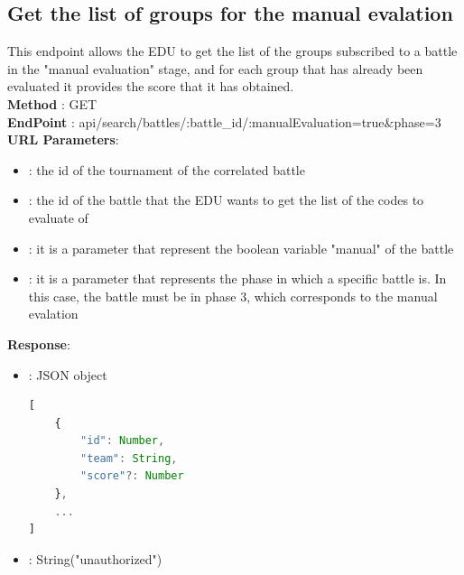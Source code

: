 \subsection*{Get the list of groups for the manual evalation}
This endpoint allows the EDU to get the list of the groups subscribed to a battle in the "manual evaluation" stage, and for each group that has already been evaluated it provides the score that it has obtained.\\
\textbf{Method} : GET \\
\textbf{EndPoint} : api/search/battles/:battle\_id/:manualEvaluation=true\&phase=3 \\
\textbf{URL Parameters}:
\begin{itemize}
    \item {} : the id of the tournament of the correlated battle
    \item {} : the id of the battle that the EDU wants to get the list of the codes to evaluate of
    \item {} : it is a parameter that represent the boolean variable "manual" of the battle
    \item {} : it is a parameter that represents the phase in which a specific battle is. In this case, the battle must be in phase 3, which corresponds to the manual evalation
\end{itemize}
\textbf{Response}:
\begin{itemize}
    \item {} : JSON object
          \begin{lstlisting}[language=JavaScript, label={lst:jscode}, basicstyle=\ttfamily]
[
    {
        "id": Number,
        "team": String,
        "score"?: Number
    },
    ...
]
        \end{lstlisting}
    \item {} : String("unauthorized")
\end{itemize}

